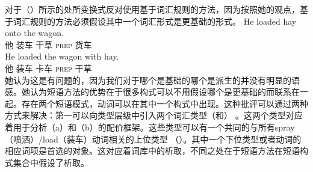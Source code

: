 \begin{exe}
\begin{xlist}[iv.]
\begin{exe}
\begin{xlist}[iv.]
 \citet[]{Goldberg95a}对于（）所示的处所变换式反对使用基于词汇规则的方法，因为按照她的观点，基于词汇规则的方法必须假设其中一个词汇形式是更基础的形式。
\eal
\ex
\gll He loaded hay onto the wagon.\\
     他 装车 干草 \textsc{prep}  货车\\
\ex
\gll He loaded the wagon with hay.\\
     他 装车  卡车 \textsc{prep} 干草\\
\zl
她认为这是有问题的，因为我们对于哪个是基础的哪个是派生的并没有明显的语感。她认为短语方法的优势在于很多构式可以不用假设哪个是更基础的而联系在一起。存在两个短语模式，动词可以在其中一个构式中出现。这种批评可以通过两种方式来解决：第一可以向类型层级中引入两个词汇类型（和） 。这两个类型对应着用于分析（a）和（b）的配价框架。这些类型可以有一个共同的与所有spray（喷洒）/load（装车）动词相关的上位类型 （）。其中一个下位类型或者动词的相应词项是首选的对象。这对应着词库中的析取，不同之处在于短语方法在短语构式集合中假设了析取。


\end{xlist}
\end{exe}
\end{xlist}
\end{exe}
